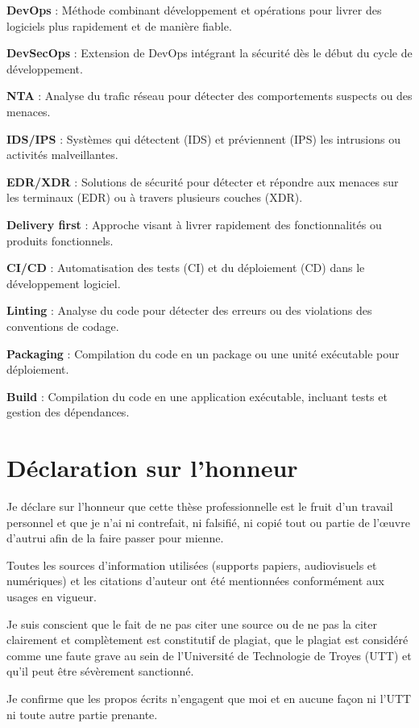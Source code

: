 \documentclass[
  11pt,
  a4paper,
  krantz2,
  11pt,
  oneside]{krantz}
\begin{document}
\textbf{DevOps} : Méthode combinant développement et opérations pour livrer des logiciels plus rapidement et de manière fiable.

\textbf{DevSecOps} : Extension de DevOps intégrant la sécurité dès le début du cycle de développement.

\textbf{NTA} : Analyse du trafic réseau pour détecter des comportements suspects ou des menaces.

\textbf{IDS/IPS} : Systèmes qui détectent (IDS) et préviennent (IPS) les intrusions ou activités malveillantes.

\textbf{EDR/XDR} : Solutions de sécurité pour détecter et répondre aux menaces sur les terminaux (EDR) ou à travers plusieurs couches (XDR).

\textbf{Delivery first} : Approche visant à livrer rapidement des fonctionnalités ou produits fonctionnels.

\textbf{CI/CD} : Automatisation des tests (CI) et du déploiement (CD) dans le développement logiciel.

\textbf{Linting} : Analyse du code pour détecter des erreurs ou des violations des conventions de codage.

\textbf{Packaging} : Compilation du code en un package ou une unité exécutable pour déploiement.

\textbf{Build} : Compilation du code en une application exécutable, incluant tests et gestion des dépendances.

\chapter{Déclaration sur l'honneur}\label{duxe9claration-sur-lhonneur}

Je déclare sur l'honneur que cette thèse professionnelle est le fruit d'un travail personnel et que je n'ai ni contrefait, ni falsifié, ni copié tout ou partie de l'œuvre d'autrui afin de la faire passer pour mienne.

Toutes les sources d'information utilisées (supports papiers, audiovisuels et numériques) et les citations d'auteur ont été mentionnées conformément aux usages en vigueur.

Je suis conscient que le fait de ne pas citer une source ou de ne pas la citer clairement et complètement est constitutif de plagiat, que le plagiat est considéré comme une faute grave au sein de l'Université de Technologie de Troyes (UTT) et qu'il peut être sévèrement sanctionné.

Je confirme que les propos écrits n'engagent que moi et en aucune façon ni l'UTT ni toute autre partie prenante.
\end{document}
